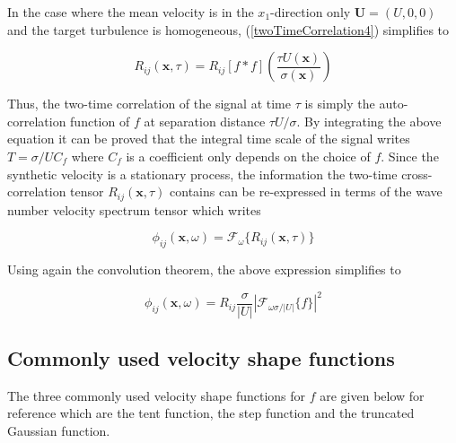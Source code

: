 \noindent In the case where the mean velocity is in the $x_1$-direction only $\boldsymbol{U} = (U,0,0)$ and the target turbulence is homogeneous, (\ref{twoTimeCorrelation4}) simplifies to

\begin{equation}
R_{ij}(\boldsymbol{x},\tau) = R_{ij} [f*f]\left(\frac{\tau U(\boldsymbol{x})}{\sigma(\boldsymbol{x})}\right)
\end{equation}

\noindent Thus, the two-time correlation of the signal at time $\tau$ is simply the auto-correlation function of $f$ at separation distance $\tau U /\sigma$. By integrating the above equation it can be proved that the integral time scale of the signal writes $T = \sigma/U C_f$ where $C_f$ is a coefficient only depends on the choice of $f$. Since the synthetic velocity is a stationary process, the information the two-time cross-correlation tensor $R_{ij}(\boldsymbol{x},\tau)$ contains can be re-expressed in terms of the wave number velocity spectrum tensor which writes

\begin{equation}
\phi_{ij}(\boldsymbol{x},\omega) = \mathcal{F}_{\omega}\{R_{ij}(\boldsymbol{x},\tau)\}
\end{equation}

\noindent Using again the convolution theorem, the above expression simplifies to

\begin{equation}
\phi_{ij}(\boldsymbol{x},\omega) = R_{ij}\frac{\sigma}{|U|} |\mathcal{F}_{\omega\sigma / |U|}\{f\}|^2
\end{equation}

\subsection{Commonly used velocity shape functions}

The three commonly used velocity shape functions for $f$ are given below for reference which are the tent function, the step function and the truncated Gaussian function.

